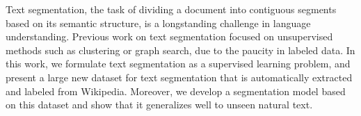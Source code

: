 Text segmentation, the task of dividing a document into contiguous segments based on its semantic structure, is a longstanding challenge in language understanding. Previous work on text segmentation focused on unsupervised methods such as clustering or graph search, due to the paucity in labeled data. In this work, we formulate text segmentation as a supervised learning problem, and present a large new dataset for text segmentation that is automatically extracted and labeled from Wikipedia. Moreover, we develop a segmentation model based on this dataset and show that it generalizes well to unseen natural text.
